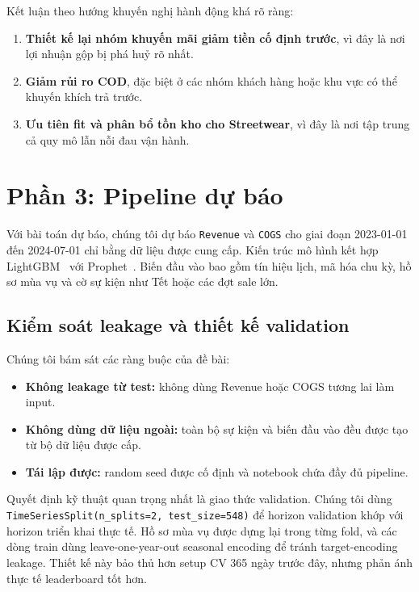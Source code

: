 \documentclass[10pt,twocolumn]{article}
\begin{document}
Kết luận theo hướng khuyến nghị hành động khá rõ ràng:
\begin{enumerate}
  \item \textbf{Thiết kế lại nhóm khuyến mãi giảm tiền cố định trước}, vì đây là nơi lợi nhuận gộp bị phá huỷ rõ nhất.
  \item \textbf{Giảm rủi ro COD}, đặc biệt ở các nhóm khách hàng hoặc khu vực có thể khuyến khích trả trước.
  \item \textbf{Ưu tiên fit và phân bổ tồn kho cho Streetwear}, vì đây là nơi tập trung cả quy mô lẫn nỗi đau vận hành.
\end{enumerate}

\section{Phần 3: Pipeline dự báo}
Với bài toán dự báo, chúng tôi dự báo \texttt{Revenue} và \texttt{COGS} cho giai đoạn 2023-01-01 đến 2024-07-01 chỉ bằng dữ liệu được cung cấp. Kiến trúc mô hình kết hợp LightGBM~\citep{ke2017lightgbm} với Prophet~\citep{taylor2018forecasting}. Biến đầu vào bao gồm tín hiệu lịch, mã hóa chu kỳ, hồ sơ mùa vụ và cờ sự kiện như Tết hoặc các đợt sale lớn.

\subsection{Kiểm soát leakage và thiết kế validation}
Chúng tôi bám sát các ràng buộc của đề bài:
\begin{itemize}
  \item \textbf{Không leakage từ test:} không dùng Revenue hoặc COGS tương lai làm input.
  \item \textbf{Không dùng dữ liệu ngoài:} toàn bộ sự kiện và biến đầu vào đều được tạo từ bộ dữ liệu được cấp.
  \item \textbf{Tái lập được:} random seed được cố định và notebook chứa đầy đủ pipeline.
\end{itemize}

Quyết định kỹ thuật quan trọng nhất là giao thức validation. Chúng tôi dùng \texttt{TimeSeriesSplit(n\_splits=2, test\_size=548)} để horizon validation khớp với horizon triển khai thực tế. Hồ sơ mùa vụ được dựng lại trong từng fold, và các dòng train dùng leave-one-year-out seasonal encoding để tránh target-encoding leakage. Thiết kế này bảo thủ hơn setup CV 365 ngày trước đây, nhưng phản ánh thực tế leaderboard tốt hơn.
\end{document}

